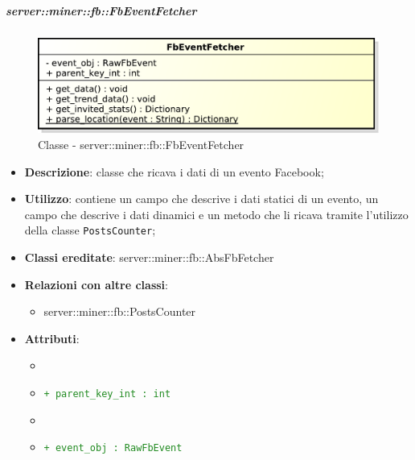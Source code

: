 		\subparagraph{server::miner::fb::FbEventFetcher} %
		\label{subp:server_miner_fb_FbEventFetcher}
		    \begin{figure}[!htbp]
 		 		\centering
 				\centerline{\includegraphics[scale=0.75]{./images/server/classes/miner/fb_event_fetcher.pdf}}
 				\caption{Classe - server::miner::fb::FbEventFetcher}
			\end{figure}
			\begin{itemize}
				\item \textbf{Descrizione}: classe che ricava i dati di un evento Facebook;
				\item \textbf{Utilizzo}: contiene un campo che descrive i dati statici di un evento, un campo che descrive i dati dinamici e un metodo che li ricava tramite l'utilizzo della classe \texttt{PostsCounter};
				\item \textbf{Classi ereditate}: server::miner::fb::AbsFbFetcher
				\item \textbf{Relazioni con altre classi}:
					\begin{itemize}
						\item server::miner::fb::PostsCounter
					\end{itemize}
				\item \textbf{Attributi}: 
					\begin{itemize}
						\item \item \textcolor{forestgreen}{\texttt{+ parent\_key\_int : int}}
						\item \item \textcolor{forestgreen}{\texttt{+ event\_obj : RawFbEvent}}
\end{itemize}
\end{itemize}
